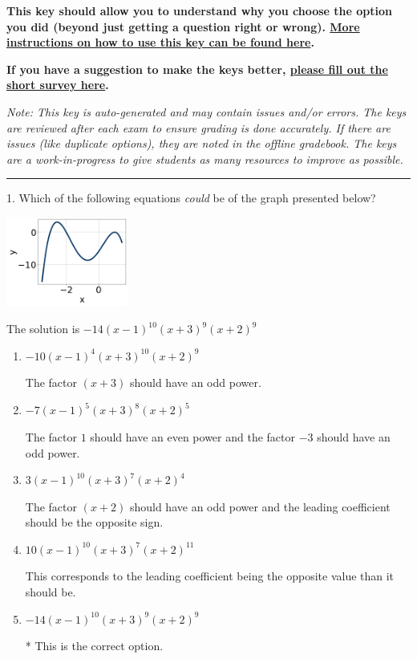 \documentclass{extbook}[14pt]
\begin{document}
\textbf{This key should allow you to understand why you choose the option you did (beyond just getting a question right or wrong). \href{https://xronos.clas.ufl.edu/mac1105spring2020/courseDescriptionAndMisc/Exams/LearningFromResults}{More instructions on how to use this key can be found here}.}

\textbf{If you have a suggestion to make the keys better, \href{https://forms.gle/CZkbZmPbC9XALEE88}{please fill out the short survey here}.}

\textit{Note: This key is auto-generated and may contain issues and/or errors. The keys are reviewed after each exam to ensure grading is done accurately. If there are issues (like duplicate options), they are noted in the offline gradebook. The keys are a work-in-progress to give students as many resources to improve as possible.}

\rule{\textwidth}{0.4pt}

1. Which of the following equations \textit{could} be of the graph presented below?
\begin{center} \includegraphics[width=0.3\textwidth]{../Figures/polyGraphToFunctionA.png} \end{center} 

The solution is $ -14(x - 1)^{10} (x + 3)^{9} (x + 2)^{9} $ 

\begin{enumerate}[label=\Alph*.] 
\item $ -10(x - 1)^{4} (x + 3)^{10} (x + 2)^{9} $ 

 The factor $(x + 3)$ should have an odd power. 
\item $ -7(x - 1)^{5} (x + 3)^{8} (x + 2)^{5} $ 

 The factor $1$ should have an even power and the factor $-3$ should have an odd power. 
\item $ 3(x - 1)^{10} (x + 3)^{7} (x + 2)^{4} $ 

 The factor $(x + 2)$ should have an odd power and the leading coefficient should be the opposite sign. 
\item $ 10(x - 1)^{10} (x + 3)^{7} (x + 2)^{11} $ 

 This corresponds to the leading coefficient being the opposite value than it should be. 
\item $ -14(x - 1)^{10} (x + 3)^{9} (x + 2)^{9} $ 

 * This is the correct option. 
\end{enumerate} 
 
\end{document}

